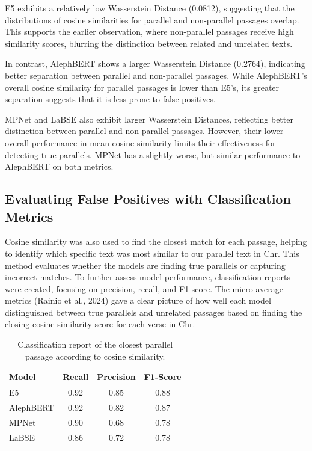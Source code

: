 \documentclass[12pt]{article}
\begin{document}
E5 exhibits a relatively low Wasserstein Distance (0.0812), suggesting that the distributions of cosine similarities for parallel and non-parallel passages overlap. This supports the earlier observation, where non-parallel passages receive high similarity scores, blurring the distinction between related and unrelated texts.

In contrast, AlephBERT shows a larger Wasserstein Distance (0.2764), indicating better separation between parallel and non-parallel passages. While AlephBERT’s overall cosine similarity for parallel passages is lower than E5’s, its greater separation suggests that it is less prone to false positives.

MPNet and LaBSE also exhibit larger Wasserstein Distances, reflecting better distinction between parallel and non-parallel passages. However, their lower overall performance in mean cosine similarity limits their effectiveness for detecting true parallels. MPNet has a slightly worse, but similar performance to AlephBERT on both metrics.

\subsection{Evaluating False Positives with Classification Metrics}
Cosine similarity was also used to find the closest match for each passage, helping to identify which specific text was most similar to our parallel text in Chr. This method evaluates whether the models are finding true parallels or capturing incorrect matches. To further assess model performance, classification reports were created, focusing on precision, recall, and F1-score. The micro average metrics (Rainio et al., 2024) gave a clear picture of how well each model distinguished between true parallels and unrelated passages based on finding the closing cosine similarity score for each verse in Chr.

\begin{table}[htbp]
\centering
\label{tab:classification}
\begin{tabular}{@{}lccc@{}}
\toprule
\textbf{Model} & \textbf{Recall} & \textbf{Precision} & \textbf{F1-Score} \\ 
\midrule
E5         & 0.92 & 0.85 & 0.88 \\
AlephBERT  & 0.92 & 0.82 & 0.87 \\
MPNet      & 0.90 & 0.68 & 0.78 \\
LaBSE      & 0.86 & 0.72 & 0.78 \\
\bottomrule
\end{tabular}
\caption{Classification report of the closest parallel passage according to cosine similarity.}
\end{table}
\end{document}
